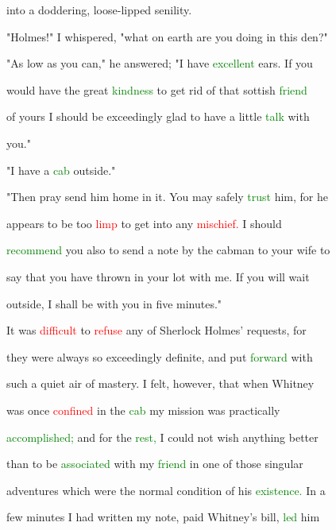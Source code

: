  into a doddering, loose-lipped senility.



 "Holmes!" I whispered, "what on earth are you doing in this den?"



 "As low as you can," he answered; "I have \textcolor{green}{excellent} ears. If you

 would have the great \textcolor{green}{kindness} to get rid of that sottish \textcolor{green}{friend}

 of yours I should be exceedingly \textcolor{BurntOrange}{glad} to have a little \textcolor{green}{talk} with

 you."



 "I have a \textcolor{green}{cab} outside."



 "Then \textcolor{BurntOrange}{pray} send him home in it. You may safely \textcolor{green}{trust} him, for he

 appears to be too \textcolor{red}{limp} to get into any \textcolor{red}{mischief.} I should

 \textcolor{green}{recommend} you also to send a note by the cabman to your wife to

 say that you have thrown in your lot with me. If you will \textcolor{BurntOrange}{wait}

 outside, I shall be with you in five minutes."



 It was \textcolor{red}{difficult} to \textcolor{red}{refuse} any of Sherlock Holmes' requests, for

 they were always so exceedingly definite, and put \textcolor{green}{forward} with

 such a \textcolor{BurntOrange}{quiet} air of \textcolor{BurntOrange}{mastery.} I felt, however, that when Whitney

 was once \textcolor{red}{confined} in the \textcolor{green}{cab} my mission was practically

 \textcolor{green}{accomplished;} and for the \textcolor{green}{rest,} I could not wish anything better

 than to be \textcolor{green}{associated} with my \textcolor{green}{friend} in one of those singular

 \textcolor{BurntOrange}{adventures} which were the normal condition of his \textcolor{green}{existence.} In a

 few minutes I had written my note, paid Whitney's bill, \textcolor{green}{led} him

